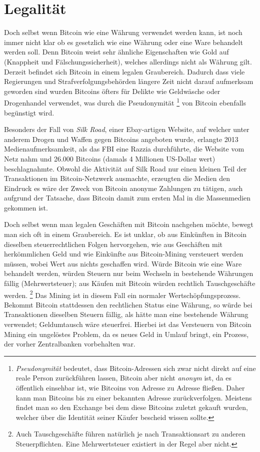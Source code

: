 \section{Legalität}

Doch selbst wenn Bitcoin wie eine Währung verwendet werden kann, ist noch immer nicht klar ob es gesetzlich wie eine Währung oder eine Ware behandelt werden soll.
Denn Bitcoin weist sehr ähnliche Eigenschaften wie Gold auf (Knappheit und Fälschungssicherheit), welches allerdings nicht als Währung gilt.
Derzeit befindet sich Bitcoin in einem legalen Graubereich.
Dadurch dass viele Regierungen und Strafverfolgungsbehörden längere Zeit nicht darauf aufmerksam geworden sind wurden Bitcoins öfters für Delikte wie Geldwäsche  oder Drogenhandel  verwendet, was durch die Pseudonymität%
\footnote{\emph{Pseudonymität} bedeutet, dass Bitcoin-Adressen sich zwar nicht direkt auf eine reale Person zurückführen lassen, Bitcoin aber nicht \emph{anonym} ist, da es öffentlich einsehbar ist, wie Bitcoins von Adresse zu Adresse fließen.
Daher kann man Bitcoins bis zu einer bekannten Adresse zurückverfolgen.
Meistens findet man so den Exchange bei dem diese Bitcoins zuletzt gekauft wurden, welcher über die Identität seiner Käufer bescheid wissen sollte.}
von Bitcoin ebenfalls begünstigt wird.

Besonders der Fall von \emph{Silk Road}, einer Ebay-artigen Website, auf welcher unter anderem Drogen und Waffen gegen Bitcoins angeboten wurde, erlangte 2013 Medienaufmerksamkeit, als das FBI eine Razzia durchführte, die Website vom Netz nahm und 26.000 Bitcoins (damals 4 Millionen US-Dollar wert) beschlagnahmte.
Obwohl die Aktivität auf Silk Road nur einen kleinen Teil der Transaktionen im Bitcoin-Netzwerk ausmachte, erzeugten die Medien den Eindruck es wäre der Zweck von Bitcoin anonyme Zahlungen zu tätigen, auch aufgrund der Tatsache, dass Bitcoin damit zum ersten Mal in die Massenmedien gekommen ist.

Doch selbst wenn man legalen Geschäften mit Bitcoin nachgehen möchte, bewegt man sich oft in einem Graubereich.
Es ist unklar, ob aus Einkünften in Bitcoin dieselben steuerrechtlichen Folgen hervorgehen, wie aus Geschäften mit herkömmlichen Geld und wie Einkünfte aus Bitcoin-Mining versteuert werden müssen, wobei Wert aus nichts geschaffen wird.
Würde Bitcoin wie eine Ware behandelt werden, würden Steuern nur beim Wechseln in bestehende Währungen fällig (Mehrwertsteuer); aus Käufen mit Bitcoin würden rechtlich Tauschgeschäfte werden.%
\footnote{Auch Tauschgeschäfte führen natürlich je nach Transaktionsart zu anderen Steuerpflichten.
Eine Mehrwertsteuer existiert in der Regel aber nicht.}
Das Mining ist in diesem Fall ein normaler Wertschöpfungsprozess.
Bekommt Bitcoin stattdessen den rechtlichen Status eine Währung, so würde bei Transaktionen dieselben Steuern fällig, als hätte man eine bestehende Währung verwendet; Geldumtausch wäre steuerfrei.
Hierbei ist das Versteuern von Bitcoin Mining ein ungelöstes Problem, da es neues Geld in Umlauf bringt, ein Prozess, der vorher Zentralbanken vorbehalten war.
